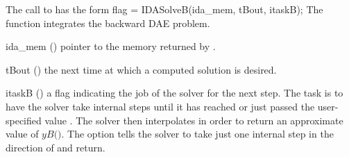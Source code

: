 The call to  has the form
{
  flag = IDASolveB(ida\_mem, tBout, itaskB);
}
{
  The function  integrates the backward DAE problem.
}
{
  \begin{args}
  \item[ida\_mem] ()
    pointer to the {\idas} memory returned by .
  \item[tBout] ()
    the next time at which a computed solution is desired.
  \item[itaskB] ()
    a flag indicating the job of the solver for the next step. 
    The  task is to have the solver take internal steps until   
    it has reached or just passed the user-specified value .
    The solver then interpolates in order to   
    return an approximate value of $yB($$)$. 
    The  option tells the solver to take just one internal
    step in the direction of  and return. 
  \end{args}
}

